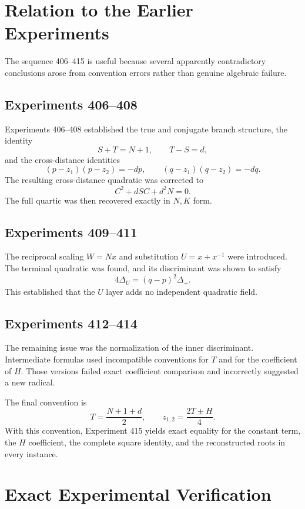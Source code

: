 \documentclass[11pt,a4paper]{article}
\theoremstyle{definition}
\theoremstyle{remark}
\begin{document}
\section{Relation to the Earlier Experiments}

The sequence 406--415 is useful because several apparently contradictory conclusions arose from convention errors rather than genuine algebraic failure.

\subsection{Experiments 406--408}
Experiments 406--408 established the true and conjugate branch structure, the identity
\[
S+T=N+1,
\qquad
T-S=d,
\]
and the cross-distance identities
\[
(p-z_1)(p-z_2)=-dp,
\qquad
(q-z_1)(q-z_2)=-dq.
\]
The resulting cross-distance quadratic was corrected to
\[
C^2+dSC+d^2N=0.
\]
The full quartic was then recovered exactly in $N,K$ form.

\subsection{Experiments 409--411}
The reciprocal scaling $W=Nx$ and substitution $U=x+x^{-1}$ were introduced. The terminal quadratic was found, and its discriminant was shown to satisfy
\[
4\Delta_U=(q-p)^2\Delta_+.
\]
This established that the $U$ layer adds no independent quadratic field.

\subsection{Experiments 412--414}
The remaining issue was the normalization of the inner discriminant. Intermediate formulas used incompatible conventions for $T$ and for the coefficient of $H$. Those versions failed exact coefficient comparison and incorrectly suggested a new radical.

The final convention is
\[
T=\frac{N+1+d}{2},
\qquad
z_{1,2}=\frac{2T\pm H}{4}.
\]
With this convention, Experiment 415 yields exact equality for the constant term, the $H$ coefficient, the complete square identity, and the reconstructed roots in every instance.

\section{Exact Experimental Verification}
\end{document}
